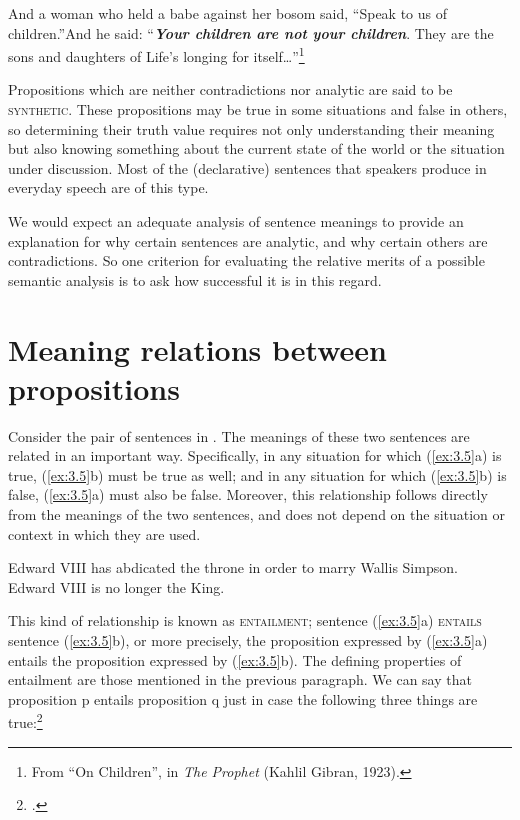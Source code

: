 \ea \label{ex:3.4}
And a woman who held a babe against her bosom said, “Speak to us of children.”And he said: “\textbf{\textit{Your children are not your children}}. They are the sons and daughters of Life’s longing for itself…”\footnote{From “On Children”, in \textit{The Prophet} (Kahlil Gibran, 1923).}
\z


Propositions which are neither contradictions nor analytic are said to be \textsc{synthetic}. These propositions may be true in some situations and false in others, so determining their truth value requires not only understanding their meaning but also knowing something about the current state of the world or the situation under discussion. Most of the (declarative) sentences that speakers produce in everyday speech are of this type.



We would expect an adequate analysis of sentence meanings to provide an explanation for why certain sentences are analytic, and why certain others are contradictions. So one criterion for evaluating the relative merits of a possible semantic analysis is to ask how successful it is in this regard.


\section{Meaning relations between propositions}\label{sec:} %

Consider the pair of sentences in . The meanings of these two sentences are related in an important way. Specifically, in any situation for which (\ref{ex:3.5}a) is true, (\ref{ex:3.5}b) must be true as well; and in any situation for which (\ref{ex:3.5}b) is false, (\ref{ex:3.5}a) must also be false. Moreover, this relationship follows directly from the meanings of the two sentences, and does not depend on the situation or context in which they are used.


\ea \label{ex:3.5}
\ea Edward VIII has abdicated the throne in order to marry Wallis Simpson.\\
\ex Edward VIII is no longer the King.
                       \z
\z


This kind of relationship is known as \textsc{entailment}; sentence (\ref{ex:3.5}a) \textsc{entails} sentence (\ref{ex:3.5}b), or more precisely, the proposition expressed by (\ref{ex:3.5}a) entails the proposition expressed by (\ref{ex:3.5}b). The defining properties of entailment are those mentioned in the previous paragraph. We can say that proposition p entails proposition q just in case the following three things are true:\footnote{\citet[29]{Cruse2000}.}


